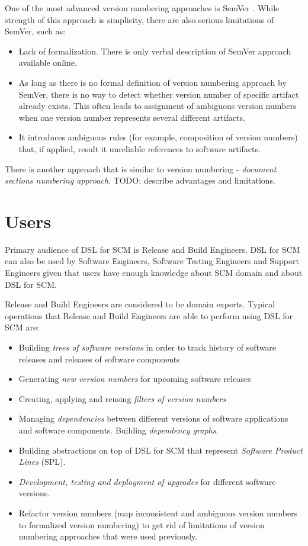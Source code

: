 \documentclass[11pt]{article}
\begin{document}
One of the most advanced version numbering approaches is SemVer \cite{semver}. While strength of this approach is simplicity, there are also serious limitations of SemVer, such as:
\begin{itemize}
\item Lack of formalization. There is only verbal description of SemVer approach available online. 
\item As long as there is no formal definition of version numbering approach by SemVer, there is no way to detect whether version number of specific artifact already exists. This often leads to assignment of ambiguous version numbers when one version number represents several different artifacts.
\item It introduces ambiguous rules (for example, composition of version numbers) that, if applied, result it unreliable references to software artifacts.
\end{itemize}

There is another approach that is similar to version numbering - \textit{document sections numbering approach}. TODO: describe advantages and limitations.

\section{Users}
\label{sec:users}

Primary audience of DSL for SCM is Release and Build Engineers. DSL for SCM can also be used by Software Engineers, Software Testing Engineers and Support Engineers given that users have enough knowledge about SCM domain and about DSL for SCM. 

Release and Build Engineers are considered to be domain experts. Typical operations that Release and Build Engineers are able to perform using DSL for SCM are:
\begin{itemize}
\item Building \textit{trees of software versions} in order to track history of software releases and releases of software components 
\item Generating \textit{new version numbers} for upcoming software releases
\item Creating, applying and reusing \textit{filters of version numbers}
\item Managing \textit{dependencies} between different versions of software applications and software components. Building \textit{dependency graphs}.
\item Building abstractions on top of DSL for SCM that represent \textit{Software Product Lines} (SPL).
\item \textit{Development, testing and deployment of upgrades} for different software versions. 
\item Refactor version numbers (map inconsistent and ambiguous version numbers to formalized version numbering) to get rid of limitations of version numbering approaches that were used previously.
\end{itemize}
\end{document}

